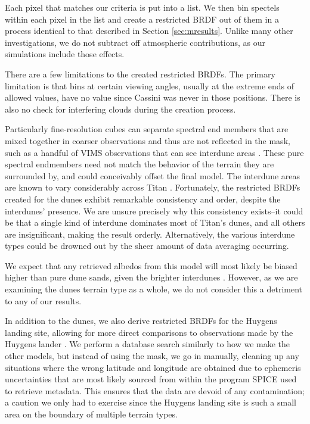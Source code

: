 \documentclass[twocolumn,linenumbers]{aastex631}
\begin{document}
Each pixel that matches our criteria is put into a list. We then bin spectels within each pixel in the list and create a restricted BRDF out of them in a process identical to that described in Section \ref{sec:mresults}. Unlike many other investigations, we do not subtract off atmospheric contributions, as our simulations include those effects.

There are a few limitations to the created restricted BRDFs. The primary limitation is that bins at certain viewing angles, usually at the extreme ends of allowed values, have no value since Cassini was never in those positions. There is also no check for interfering clouds during the creation process.

Particularly fine-resolution cubes can separate spectral end members that are mixed together in coarser observations and thus are not reflected in the mask, such as a handful of VIMS observations that can see interdune areas \citep{Barnes2008}. These pure spectral endmembers need not match the behavior of the terrain they are surrounded by, and could conceivably offset the final model. The interdune areas are known to vary considerably across Titan \citep{Bonnefoy2016}. Fortunately, the restricted BRDFs created for the dunes exhibit remarkable consistency and order, despite the interdunes' presence. We are unsure precisely why this consistency exists--it could be that a single kind of interdune dominates most of Titan's dunes, and all others are insignificant, making the result orderly. Alternatively, the various interdune types could be drowned out by the sheer amount of data averaging occurring.

We expect that any retrieved albedos from this model will most likely be biased higher than pure dune sands, given the brighter interdunes \citep{Bonnefoy2016}. However, as we are examining the dunes terrain type as a whole, we do not consider this a detriment to any of our results.

In addition to the dunes, we also derive restricted BRDFs for the Huygens landing site, allowing for more direct comparisons to observations made by the Huygens lander \citep{Tomasko2008}. We perform a database search similarly to how we make the other models, but instead of using the mask, we go in manually, cleaning up any situations where the wrong latitude and longitude are obtained due to ephemeris uncertainties that are most likely sourced from within the program SPICE \citep{Anton1999} used to retrieve metadata. This ensures that the data are devoid of any contamination; a caution we only had to exercise since the Huygens landing site is such a small area on the boundary of multiple terrain types.
\end{document}
